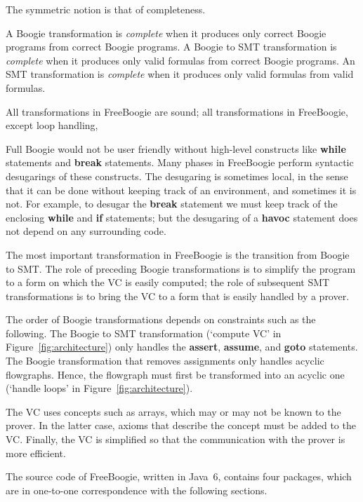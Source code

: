 \documentclass{llncs}
\begin{document}
The symmetric notion is that of completeness.

\begin{definition}
A Boogie transformation is \emph{complete} when it produces
only correct Boogie programs from correct Boogie programs. A
Boogie to SMT transformation is \emph{complete} when it produces
only valid formulas from correct Boogie programs. An SMT
transformation is \emph{complete} when it produces only valid
formulas from valid formulas.
\label{def:complete-transform}
\end{definition}

All transformations in FreeBoogie are sound; all transformations
in FreeBoogie, except loop handling,

Full Boogie would not be user friendly without high-level
constructs like \textbf{while} statements and \textbf{break}
statements. Many phases in FreeBoogie perform syntactic
desugarings of these constructs. The desugaring is sometimes
local, in the sense that it can be done without keeping track of
an environment, and sometimes it is not. For example, to desugar
the \textbf{break} statement we must keep track of the enclosing
\textbf{while} and \textbf{if} statements; but the desugaring of
a \textbf{havoc} statement does not depend on any surrounding
code.

The most important transformation in FreeBoogie is the
transition from Boogie to SMT\null. The role of preceding Boogie
transformations is to simplify the program to a form on which the
VC is easily computed; the role of subsequent SMT transformations
is to bring the VC to a form that is easily handled by a prover.

The order of Boogie transformations depends on constraints
such as the following. The Boogie to SMT transformation
(`compute VC' in Figure~\ref{fig:architecture}) only handles
the \textbf{assert}, \textbf{assume}, and \textbf{goto}
statements. The Boogie transformation that removes assignments
only handles acyclic flowgraphs. Hence, the flowgraph must
first be transformed into an acyclic one (`handle loops' in
Figure~\ref{fig:architecture}).

The VC uses concepts such as arrays, which may or may not be
known to the prover. In the latter case, axioms that describe
the concept must be added to the VC\null. Finally, the VC is
simplified so that the communication with the prover is
more efficient.

The source code of FreeBoogie, written in Java~6, contains
four packages, which are in one-to-one correspondence with the
following sections.
\end{document}
